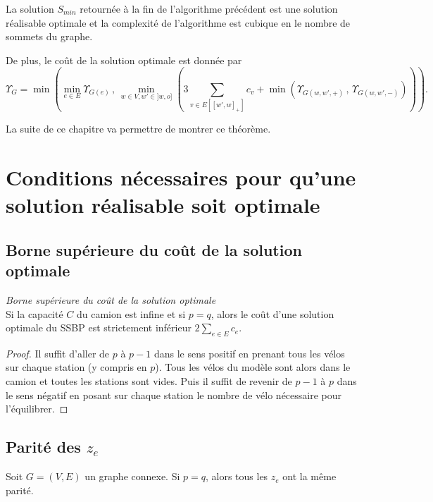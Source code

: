 \begin{thm} \label{thm: optimalité algo infini}
La solution $S_{min}$ retournée à la fin de l'algorithme précédent est une solution réalisable optimale et la complexité de l'algorithme est cubique en le nombre de sommets du graphe.

De plus, le coût de la solution optimale est donnée par
$$
\Upsilon_{G} = \min
\left(
  \min_{e \in E} \Upsilon_{G(e)}\,,\,
  \min_{w \in V, w' \in ]w,o]}
  \left(
    3 \sum_{ v \in E\left[ \left[w',w\right]_+ \right] }c_v + \min \left( \Upsilon_{G(w,w',+)} \,,\, \Upsilon_{G(w,w',-)} \right)
  \right)
\right).
$$
\end{thm}

La suite de ce chapitre va permettre de montrer ce théorème.

\section{Conditions nécessaires pour qu'une solution réalisable soit optimale}

\subsection{Borne supérieure du coût de la solution optimale}

\begin{lem}\label{capacite infinie - borne sup cout}
\emph{Borne supérieure du coût de la solution optimale}\\
Si la capacité $C$ du camion est infine et si $p=q$, alors le coût d'une solution optimale du SSBP est strictement inférieur $\displaystyle 2\sum_{e \in E}c_e$.
\end{lem}

\begin{proof}
Il suffit d'aller de $p$ à $p-1$ dans le sens positif en prenant tous les vélos sur chaque station (y compris en $p$). Tous les vélos du modèle sont alors dans le camion et toutes les stations sont vides. Puis il suffit de revenir de $p-1$ à $p$ dans le sens négatif en posant sur chaque station le nombre de vélo nécessaire pour l'équilibrer.
\end{proof}

\subsection{Parité des $z_e$}

\begin{prop}\label{parité des Ze}
Soit $G=(V,E)$ un graphe connexe. Si $p=q$, alors tous les $z_e$ ont la même parité.
\end{prop}

